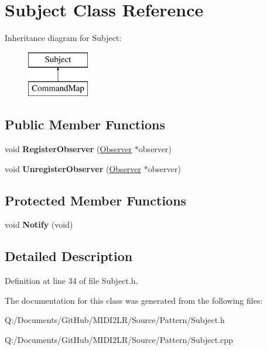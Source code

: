 \hypertarget{class_subject}{}\section{Subject Class Reference}
\label{class_subject}
Inheritance diagram for Subject\+:\begin{figure}[H]
\begin{center}
\leavevmode
\includegraphics[height=2.000000cm]{class_subject}
\end{center}
\end{figure}
\subsection*{Public Member Functions}
\begin{DoxyCompactItemize}
\item 
void {\bfseries Register\+Observer} (\hyperlink{class_observer}{Observer} $\ast$observer)\hypertarget{class_subject_ae4254eab0892ed61dae71e01a394ded6}{}\label{class_subject_ae4254eab0892ed61dae71e01a394ded6}

\item 
void {\bfseries Unregister\+Observer} (\hyperlink{class_observer}{Observer} $\ast$observer)\hypertarget{class_subject_a7106918d1c2b9a7e274bf2bd2004bbfb}{}\label{class_subject_a7106918d1c2b9a7e274bf2bd2004bbfb}

\end{DoxyCompactItemize}
\subsection*{Protected Member Functions}
\begin{DoxyCompactItemize}
\item 
void {\bfseries Notify} (void)\hypertarget{class_subject_ac8d74b2a80e2d4caa0a9a59e00a45219}{}\label{class_subject_ac8d74b2a80e2d4caa0a9a59e00a45219}

\end{DoxyCompactItemize}


\subsection{Detailed Description}


Definition at line 34 of file Subject.\+h.



The documentation for this class was generated from the following files\+:\begin{DoxyCompactItemize}
\item 
Q\+:/\+Documents/\+Git\+Hub/\+M\+I\+D\+I2\+L\+R/\+Source/\+Pattern/Subject.\+h\item 
Q\+:/\+Documents/\+Git\+Hub/\+M\+I\+D\+I2\+L\+R/\+Source/\+Pattern/Subject.\+cpp\end{DoxyCompactItemize}
